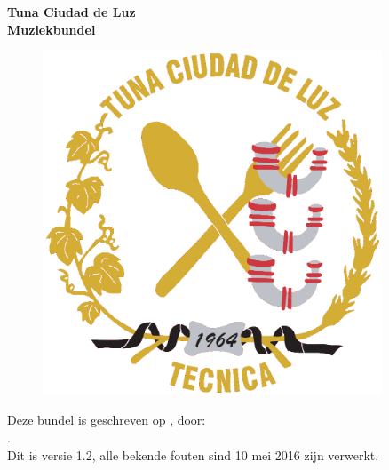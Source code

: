 \begin{titlepage}
\begin{center}
\textbf{\Huge Tuna Ciudad de Luz \\Muziekbundel}
\vfill
\end{center}
\begin{figure}[h]
\centering
\includegraphics[width=0.9\textwidth]{logo}
\end{figure}
\vfill
\makeatletter
Deze bundel is geschreven op \@date, door:\\
\@author.\\
Dit is versie 1.2, alle bekende fouten sind 10 mei 2016 zijn verwerkt.
\makeatother
\end{titlepage}
